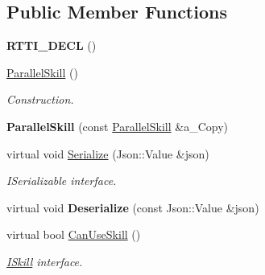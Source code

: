 \subsection*{Public Member Functions}
\begin{DoxyCompactItemize}
\item 
\mbox{\label{class_parallel_skill_addd8cd932b5fdfb1e40a450130d4b924}} 
{\bfseries R\+T\+T\+I\+\_\+\+D\+E\+CL} ()
\item 
\mbox{\label{class_parallel_skill_a1aab97bb239fd46cff2f8fb84f6cb3ab}} 
\hyperlink{class_parallel_skill_a1aab97bb239fd46cff2f8fb84f6cb3ab}{Parallel\+Skill} ()
\begin{DoxyCompactList}\small\item\em Construction. \end{DoxyCompactList}\item 
\mbox{\label{class_parallel_skill_a6ccaaf922788b26a747539b7daba66ab}} 
{\bfseries Parallel\+Skill} (const \hyperlink{class_parallel_skill}{Parallel\+Skill} \&a\+\_\+\+Copy)
\item 
\mbox{\label{class_parallel_skill_a6b8c895c0996b4edec98cf4c26724fef}} 
virtual void \hyperlink{class_parallel_skill_a6b8c895c0996b4edec98cf4c26724fef}{Serialize} (Json\+::\+Value \&json)
\begin{DoxyCompactList}\small\item\em I\+Serializable interface. \end{DoxyCompactList}\item 
\mbox{\label{class_parallel_skill_a1690236d74fc34a01c1fedd333ed9ede}} 
virtual void {\bfseries Deserialize} (const Json\+::\+Value \&json)
\item 
\mbox{\label{class_parallel_skill_adedaf3393d261b029673dc7ab02f9d71}} 
virtual bool \hyperlink{class_parallel_skill_adedaf3393d261b029673dc7ab02f9d71}{Can\+Use\+Skill} ()
\begin{DoxyCompactList}\small\item\em \hyperlink{class_i_skill}{I\+Skill} interface. \end{DoxyCompactList}\item 
\mbox{\label{class_parallel_skill_ad95fee894046921fb0d3e9c91034737e}} 

\end{DoxyCompactItemize}
